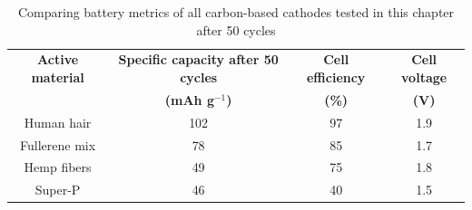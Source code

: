 \begin{table}[h!]
\centering
\caption{Comparing battery metrics of all carbon-based cathodes tested in this chapter after 50 cycles} \label{table1bm}
\begin{tabular}{|cccc|}
\hline
\textbf{Active material} & {\textbf{Specific capacity after 50 cycles}} & {\textbf{Cell efficiency}} & {\textbf{Cell voltage}}\\
 &  {\textbf{(mAh g$^{-1}$)}} & {\textbf{(\%)}} & {\textbf{(V)}}\\
\hline
Human hair & 102 & 97 & 1.9 \\
Fullerene mix &  78 & 85 & 1.7 \\
Hemp fibers & 49 & 75 & 1.8 \\
Super-P & 46 & 40 & 1.5 \\
\hline  %
\end{tabular}
\end{table}

